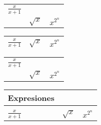 \documentclass{article} %
\begin{document}
	
\begin{tabular}{l l l}\hline
	$\displaystyle\frac{x}{x+1}$\\
	& $\sqrt{x}$
	& $x^{2^n}$\\ \hline
\end{tabular}

\begin{tabular}{l l l}\toprule
	$\displaystyle \frac{x}{x+1}$ & $\sqrt{x}$ & $x^{2^n}$\\ \bottomrule
\end{tabular}


\begin{tabular}{l l l@{\vrule height 15pt depth 10pt width 0pt}}\hline
	$\displaystyle \frac{x}{x+1}$ \\
	& $\sqrt{x}$
	& $x^{2^n}$\\ \hline
\end{tabular}

\begin{tabular}{l l l} \hline
	Expresiones & & \\ \hline
	& & \\[-8pt]
	$\displaystyle \frac{x}{x+1}$ & $\sqrt{x}$ & $x^{2^n}$ \\[8pt]\hline
\end{tabular}
\end{document}
